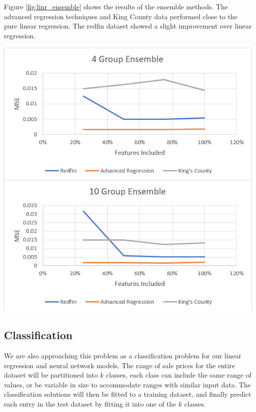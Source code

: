 \documentclass[10pt]{article}
\begin{document}
\begin{multicols}{2}
        Figure \ref{fig:linr_ensemble} shows the results of the ensemble methods. The advanced regression techniques and King County data performed close to the pure linear regression. The redfin dataset showed a slight improvement over linear regression.

		\begin{center}
            \captionsetup{type=figure}
			\includegraphics[scale=0.6]{Images/LineEnsembleResults} \\
			\label{fig:linr_ensemble}
		\end{center}

 		\subsection{Classification}
			We are also approaching this problem as a classification problem for our linear regression and neural network models. The range of sale prices for the entire dataset will be partitioned into \(k\) classes, each class can include the same range of values, or be variable in size to accommodate ranges with similar input data. The classification solutions will then be fitted to a training dataset, and finally predict each entry in the test dataset by fitting it into one of the \(k\) classes.


\end{multicols}
\end{document}
